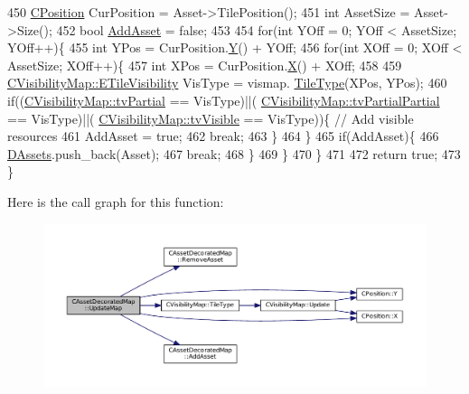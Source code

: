 \begin{DoxyCode}
450         \hyperlink{classCPosition}{CPosition} CurPosition = Asset->TilePosition();
451         \textcolor{keywordtype}{int} AssetSize = Asset->Size();
452         \textcolor{keywordtype}{bool} \hyperlink{classCAssetDecoratedMap_aaa798030159fd44251dd60aef9b00516}{AddAsset} = \textcolor{keyword}{false};
453         
454         \textcolor{keywordflow}{for}(\textcolor{keywordtype}{int} YOff = 0; YOff < AssetSize; YOff++)\{
455             \textcolor{keywordtype}{int} YPos = CurPosition.\hyperlink{classCPosition_a1aa8a30e2f08dda1f797736ba8c13a87}{Y}() + YOff;
456             \textcolor{keywordflow}{for}(\textcolor{keywordtype}{int} XOff = 0; XOff < AssetSize; XOff++)\{
457                 \textcolor{keywordtype}{int} XPos = CurPosition.\hyperlink{classCPosition_a9a6b94d3b91df1492d166d9964c865fc}{X}() + XOff;
458 
459                 \hyperlink{classCVisibilityMap_a6665f905da08825adbb0eee7bd1f2f30}{CVisibilityMap::ETileVisibility} VisType = vismap.
      \hyperlink{classCVisibilityMap_a8517fe52114dd469093fd1bd13482733}{TileType}(XPos, YPos);
460                 \textcolor{keywordflow}{if}((\hyperlink{classCVisibilityMap_a6665f905da08825adbb0eee7bd1f2f30a0037f47075e3bde5e8e32dbd55754976}{CVisibilityMap::tvPartial} == VisType)||(
      \hyperlink{classCVisibilityMap_a6665f905da08825adbb0eee7bd1f2f30a75af969b6d667b802b64bacd8bca7b63}{CVisibilityMap::tvPartialPartial} == VisType)||(
      \hyperlink{classCVisibilityMap_a6665f905da08825adbb0eee7bd1f2f30a3c881652ef7164aa086e595eef0ff5d6}{CVisibilityMap::tvVisible} == VisType))\{ \textcolor{comment}{// Add visible resources}
461                     AddAsset = \textcolor{keyword}{true};
462                     \textcolor{keywordflow}{break};
463                 \}
464             \}
465             \textcolor{keywordflow}{if}(AddAsset)\{
466                 \hyperlink{classCAssetDecoratedMap_a94eeed5b16141169b1ba6cb3842055aa}{DAssets}.push\_back(Asset);
467                 \textcolor{keywordflow}{break};
468             \}
469         \}
470     \}
471     
472     \textcolor{keywordflow}{return} \textcolor{keyword}{true};
473 \}
\end{DoxyCode}
Here is the call graph for this function\+:\nopagebreak
\begin{figure}[H]
\begin{center}
\leavevmode
\includegraphics[width=350pt]{classCAssetDecoratedMap_a7b594b6bef2eed8bbb0e4e4e6b855903_cgraph}
\end{center}
\end{figure}
